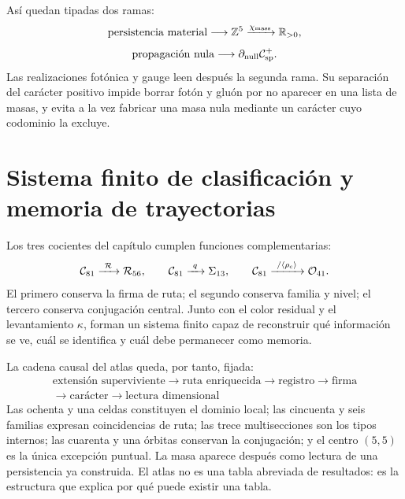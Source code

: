 Así quedan tipadas dos ramas:
\[
 \text{persistencia material}
 \longrightarrow\mathbb Z^5
 \xrightarrow{\chi_{\rm mass}}\mathbb R_{>0},
\]
\[
 \text{propagación nula}
 \longrightarrow\partial_{\rm null}\mathcal C_{\rm sp}^{+}.
\]
Las realizaciones fotónica y gauge leen después la segunda rama.  Su
separación del carácter positivo impide borrar fotón y gluón por no aparecer
en una lista de masas, y evita a la vez fabricar una masa nula mediante un
carácter cuyo codominio la excluye.

\section{Sistema finito de clasificación y memoria de trayectorias}

Los tres cocientes del capítulo cumplen funciones complementarias:
\[
 \mathcal C_{81}
 \xrightarrow{\ \mathcal R\ }\mathcal R_{56},
 \qquad
 \mathcal C_{81}
 \xrightarrow{\ q\ }\Sigma_{13},
 \qquad
 \mathcal C_{81}
 \xrightarrow{\ /\langle\rho_{\rm c}\rangle\ }
 \mathcal O_{41}.
\]
El primero conserva la firma de ruta; el segundo conserva familia y nivel;
el tercero conserva conjugación central.  Junto con el color residual y el
levantamiento \(\kappa\), forman un sistema finito capaz de reconstruir
qué información se ve, cuál se identifica y cuál debe permanecer como
memoria.

La cadena causal del atlas queda, por tanto, fijada:
\[
 \boxed{
 \begin{gathered}
 \text{extensión superviviente}
 \longrightarrow\text{ruta enriquecida}
 \longrightarrow\text{registro}
 \longrightarrow\text{firma}\\
 \longrightarrow\text{carácter}
 \longrightarrow\text{lectura dimensional}
 \end{gathered}}
 \tag{A19}\label{eq:cadena-rectora-atlas-rev6}
\]
Las ochenta y una celdas constituyen el dominio local; las cincuenta y seis
familias expresan coincidencias de ruta; las trece multisecciones son los
tipos internos; las cuarenta y una órbitas conservan la conjugación; y el
centro \((5,5)\) es la única excepción puntual.  La masa aparece después
como lectura de una persistencia ya construida.  El atlas no es una tabla
abreviada de resultados: es la estructura que explica por qué puede existir
una tabla.
